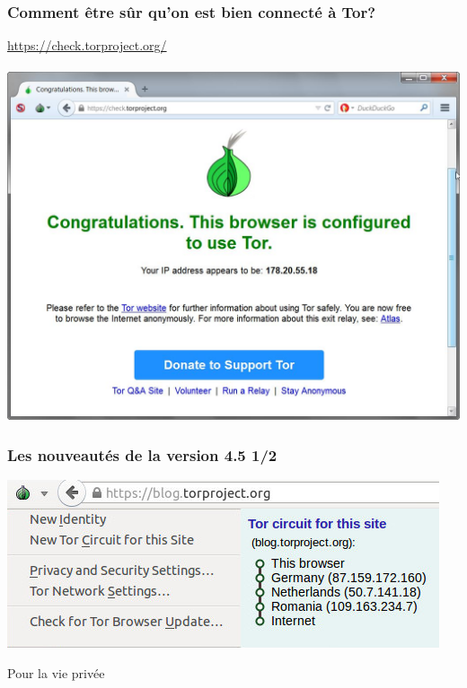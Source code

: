 \documentclass{beamer}
\begin{document}
\begin{frame}
\frametitle{Comment être sûr qu'on est bien connecté à Tor?}

\begin{center}
\url{https://check.torproject.org/}
\\~\\
\includegraphics[scale=0.4]{./images/congrats.jpg}
\end{center}
\end{frame}

\begin{frame}
\frametitle{Les nouveautés de la version 4.5 1/2}

\begin{center}
\includegraphics[scale=0.6]{./images/onionmenu.jpg}
\end{center}

\begin{block}{Pour la vie privée}
\begin{itemize}
\end{itemize}
\end{block}
\end{frame}
\end{document}

